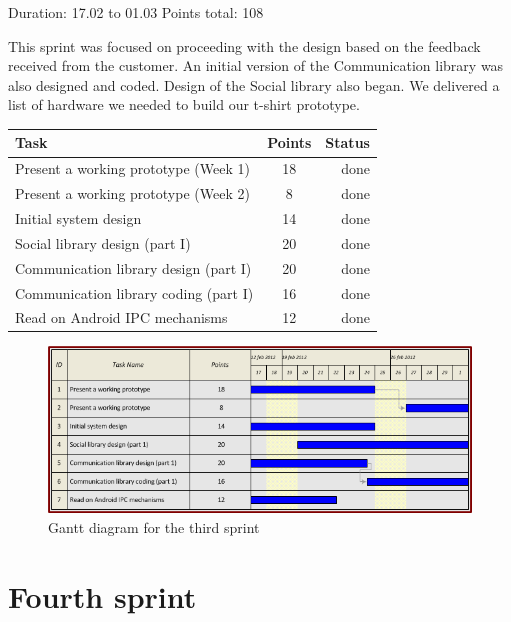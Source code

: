 Duration: 17.02 to 01.03
Points total: 108

This sprint was focused on proceeding with the design based on the
feedback received from the customer. An initial version of the Communication
library was also designed and coded. Design of the Social library also began.
We delivered a list of hardware we needed to build our t-shirt prototype.

\begin{table}[ht!]
\begin{tabular}{ | l | c | r | }

\hline
\textbf{Task} & \textbf{Points} & \textbf{Status} \\
\hline

Present a working prototype (Week 1)		& 18 & done \\
\hline
Present a working prototype (Week 2)		& 8  & done \\
\hline
Initial system design				& 14 & done \\
\hline
Social library design (part I)			& 20 & done \\
\hline
Communication library design (part I)		& 20 & done \\
\hline
Communication library coding (part I) 		& 16 & done \\
\hline
Read on Android IPC mechanisms			& 12 & done \\
\hline

\end{tabular}
\end{table}

\begin{figure}[h!]
\centering \includegraphics[scale=0.8]{img/sprints-gantt3.png}
\caption{Gantt diagram for the third sprint}
\label{fig:sprints-gantt3}
\end{figure}

\newpage


\section{Fourth sprint}

